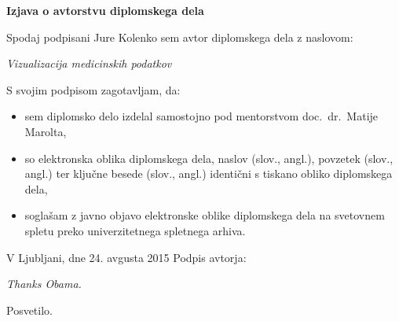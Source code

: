 \documentclass[a4paper, 12pt]{book}
\newcommand{\clearemptydoublepage}{\newpage{\pagestyle{empty}\cleardoublepage}}
\begin{document}
\vspace{2cm}

\clearemptydoublepage

\vspace*{1cm}
\begin{center}
{\Large \textbf{\sc Izjava o avtorstvu diplomskega dela}}
\end{center}

\vspace{1cm}
\noindent Spodaj podpisani Jure Kolenko sem avtor  diplomskega dela z naslovom:

\vspace{0.5cm}
\emph{Vizualizacija medicinskih podatkov}

\vspace{1.5cm}
\noindent S svojim podpisom zagotavljam, da:
\begin{itemize}
	\item sem diplomsko delo izdelal samostojno pod mentorstvom
		doc.\ dr.\ Matije Marolta,

	\item	so elektronska oblika diplomskega dela, naslov (slov., angl.), povzetek (slov., angl.) ter ključne besede (slov., angl.) identični s tiskano obliko diplomskega dela,
	\item soglašam z javno objavo elektronske oblike diplomskega dela na svetovnem spletu preko univerzitetnega spletnega arhiva.	
\end{itemize}

\vspace{1cm}
\noindent V Ljubljani, dne 24. avgusta 2015 \hfill Podpis avtorja:

\clearemptydoublepage

\thispagestyle{empty}\mbox{}\vfill\null\it%
Thanks Obama.
\rm\normalfont

\clearemptydoublepage

\thispagestyle{empty}\mbox{}{\textheight}\mbox{}\hfill\begin{minipage}{0.55\textwidth}%
\normalfont\end{minipage}
Posvetilo.
\clearemptydoublepage

\def\thepage{}%
\tableofcontents{}
\end{document}
